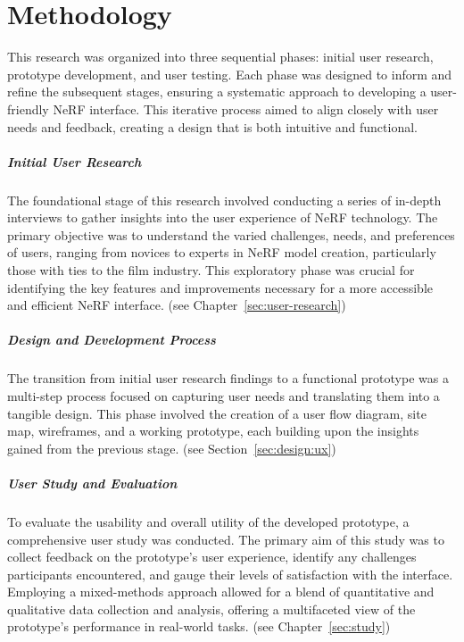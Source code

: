 %
\chapter{Methodology}
\label{sec:methodology}

This research was organized into three sequential phases: initial user research, prototype development, and user testing. 
Each phase was designed to inform and refine the subsequent stages, ensuring a systematic approach to developing a user-friendly NeRF interface. 
This iterative process aimed to align closely with user needs and feedback, creating a design that is both intuitive and functional.

\paragraph{Initial User Research}

The foundational stage of this research involved conducting a series of in-depth interviews to gather insights into the user experience of NeRF technology. 
The primary objective was to understand the varied challenges, needs, and preferences of users, ranging from novices to experts in NeRF model creation, particularly those with ties to the film industry. 
This exploratory phase was crucial for identifying the key features and improvements necessary for a more accessible and efficient NeRF interface. (see Chapter~\ref{sec:user-research})

\paragraph{Design and Development Process}

The transition from initial user research findings to a functional prototype was a multi-step process focused on capturing user needs and translating them into a tangible design. 
This phase involved the creation of a user flow diagram, site map, wireframes, and a working prototype, each building upon the insights gained from the previous stage. (see Section~\ref{sec:design:ux})

\paragraph{User Study and Evaluation}

To evaluate the usability and overall utility of the developed prototype, a comprehensive user study was conducted. 
The primary aim of this study was to collect feedback on the prototype's user experience, identify any challenges participants encountered, and gauge their levels of satisfaction with the interface. 
Employing a mixed-methods approach allowed for a blend of quantitative and qualitative data collection and analysis, offering a multifaceted view of the prototype's performance in real-world tasks. (see Chapter~\ref{sec:study})
